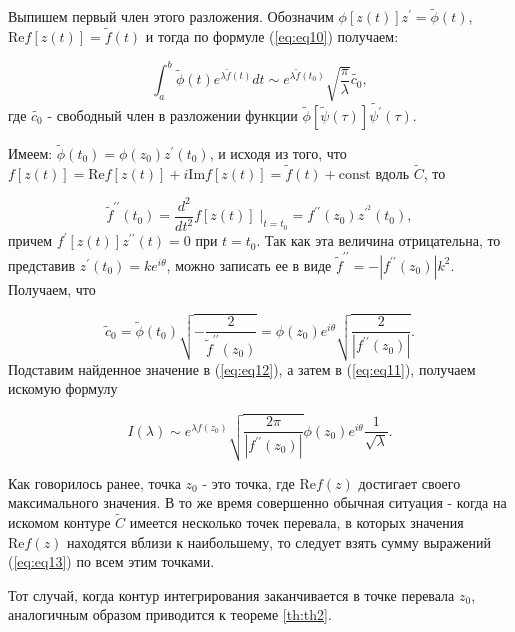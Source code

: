 \documentclass[14pt, a4paper]{article}
\numberwithin{figure}{section}
\numberwithin{equation}{section}
\renewcommand{\Re}{\mathrm{Re}}
\renewcommand{\Im}{\mathrm{Im}}
\newcommand{\const}{\mathrm{const}}
\begin{document}
Выпишем первый член этого разложения. Обозначим $\phi[z(t)]z^\prime = \widetilde{\phi}(t)$, $\Re f[z(t)] = \widetilde{f}(t)$ и тогда по формуле (\ref{eq:eq10}) получаем:

\begin{equation}\label{eq:eq12}
\int_{a}^{b} \widetilde{\phi}(t) e^{\lambda \widetilde{f}(t)}dt \sim e^{\lambda \widetilde{f}(t_0)} \sqrt{\frac{\pi}{\lambda}} \widetilde{c_0},
\end{equation}
где $\widetilde{c_0}$ - свободный член в разложении функции $\widetilde{\phi}[\widetilde{\psi}(\tau)]\widetilde{\psi^\prime}(\tau)$.

Имеем: $\widetilde{\phi}(t_0) = \phi(z_0) z^\prime (t_0)$, и исходя из того, что $f[z(t)] = \Re f[z(t)]+ i \Im f[z(t)] = \widetilde{f}(t)+\const$ вдоль $\widetilde{C}$, то

\begin{equation}\nonumber
\widetilde{f}^{\prime\prime} (t_0) = \frac{d^2}{d t^2} f[z(t)]\;|_{t=t_0} = f^{\prime\prime} (z_0) z^{\prime^2} (t_0),
\end{equation}
причем $f^\prime[z(t)] z^{\prime \prime} (t) = 0$ при $t=t_0$. Так как эта величина отрицательна, то представив $z^\prime (t_0) = k e^{i \theta}$, можно записать ее в виде $\widetilde{f}^{\prime\prime}=-|f^{\prime\prime}(z_0)| k^2$. Получаем, что 

\begin{equation}\nonumber
\widetilde{c}_0=\widetilde{\phi}(t_0) \sqrt{-\frac{2}{\widetilde{f}^{\prime\prime}(z_0)}}= \phi (z_0) e^{i \theta} \sqrt{\frac{2}{|f^{\prime\prime}(z_0)|}}.
\end{equation}
Подставим найденное значение в (\ref{eq:eq12}), а затем в (\ref{eq:eq11}), получаем искомую формулу

\begin{equation}\label{eq:eq13}
I(\lambda) \sim e^{\lambda f (z_0)}\sqrt{\frac{2\pi}{|f^{\prime \prime} (z_0)|}} \phi(z_0) e^{i \theta} \frac{1}{\sqrt{\lambda}}.
\end{equation}

Как говорилось ранее, точка $z_0$ - это точка, где $\Re f(z)$ достигает своего максимального значения. В то же время совершенно обычная ситуация - когда на искомом контуре $\widetilde{C}$ имеется несколько точек перевала, в которых значения $\Re f (z)$ находятся вблизи к наибольшему, то следует взять сумму выражений (\ref{eq:eq13}) по всем этим точками. 

Тот случай, когда контур интегрирования заканчивается в точке перевала $z_0$, аналогичным образом приводится к теореме \ref{th:th2}.
\end{document}
